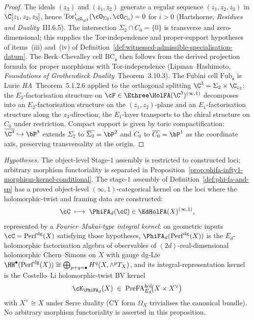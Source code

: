 \begin{proof}
The ideals $(z_3)$ and $(z_1, z_2)$ generate a regular sequence $(z_1, z_2, z_3)$ in $\C[z_1, z_2, z_3]$, hence $\mathrm{Tor}^i_{\cO_{\C^3}}(\cO_{\Sigma_2}, \cO_{C_0}) = 0$ for $i > 0$ (Hartshorne, \textit{Residues and Duality}~III.6.5). The intersection $\Sigma_2 \cap C_0 = \{0\}$ is transverse and zero-dimensional; this supplies the Tor-independence and proper-support hypotheses of items~(iii) and~(iv) of Definition~\ref{def:witnessed-admissible-specialisation-datum}. The Beck--Chevalley cell $\mathrm{BC}_{\mathfrak s}$ then follows from the derived projection formula for proper morphisms with Tor-independence (Lipman--Hashimoto, \textit{Foundations of Grothendieck Duality}~Theorem~$3.10.3$). The Fubini cell $\mathrm{Fub}_{\mathfrak s}$ is Lurie \textit{HA}~Theorem~$5.1.2.6$ applied to the orthogonal splitting $\C^3 = \Sigma_2 \times \C_{z_3}$: the $E_3$-factorisation structure on $\cF \in \Ethree\HolFA(\C^3)^{(\infty,1)}$ decomposes into an $E_2$-factorisation structure on the $(z_1, z_2)$-plane and an $E_1$-factorisation structure along the $z_3$-direction; the $E_1$-layer transports to the chiral structure on $C_0$ under restriction. Compact support is given by toric compactification: $\overline{\C^3} \hookrightarrow \bP^3$ extends $\Sigma_2$ to $\overline{\Sigma_2} = \bP^2$ and $C_0$ to $\overline{C_0} = \bP^1$ as the coordinate axis, preserving transversality at the origin.
\end{proof}

\begin{proposition}
\label{prop:phifa-infty1-kernel}
\noindent\emph{Hypotheses.} The object-level Stage-$1$ assembly is restricted to constructed loci; arbitrary morphism functoriality is separated in Proposition~\ref{prop:phifa-infty1-morphism-kernel-conditional}.
The stage-$1$ assembly of Definition~\ref{def:phi-fa-and-sp} has a proved object-level $(\infty,1)$-categorical kernel on the loci where the holomorphic-twist and framing data are constructed:
\[
 \cC \;\longmapsto\; \PhiFA_d(\cC) \in \EdHolFA(X)^{(\infty,1)},
\]
represented by a \emph{Fourier--Mukai-type integral kernel}: on geometric inputs $\cC = \mathrm{Perf}^{\mathrm{dg}}(X)$ satisfying those hypotheses, $\PhiFA_d(\mathrm{Perf}^{\mathrm{dg}}(X))$ is the $E_d$-holomorphic factorisation algebra of observables of $(2d)$-real-dimensional holomorphic Chern--Simons on $X$ with gauge dg-Lie $\HH^\bullet(\mathrm{Perf}^{\mathrm{dg}}(X)) \cong \bigoplus_{p+q=\bullet} H^q(X, \wedge^p T_X)$, and its integral-representation kernel is the Costello--Li holomorphic-twist BV kernel
\[
 \cK_{\PhiFA_d}(X) \;\in\; \mathrm{PreFA}^{\mathrm{hol}}_{E_d}\!\bigl(X \times X^\vee\bigr)
\]
with $X^\vee \cong X$ under Serre duality \textup{(}CY form
$\Omega_X$ trivialises the canonical bundle\textup{)}. No arbitrary
morphism functoriality is asserted in this proposition.
\end{proposition}

